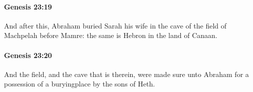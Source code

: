 		\paragraph{Genesis 23:19} %
			\label{GENESIS-23-19}

			And after this, Abraham buried Sarah his wife in the cave of the field of Machpelah before Mamre: the same is Hebron in the land of Canaan.


		\paragraph{Genesis 23:20} %
			\label{GENESIS-23-20}

			And the field, and the cave that is therein, were made sure unto Abraham for a possession of a buryingplace by the sons of Heth.

